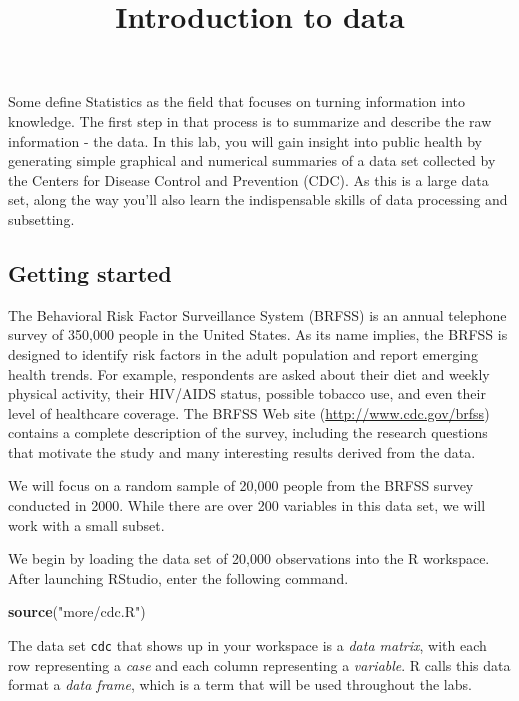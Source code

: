 \documentclass[]{article}
\title{Introduction to data}
\author{}
\date{}
\newenvironment{Shaded}{\begin{snugshade}}{\end{snugshade}}
\newcommand{\KeywordTok}[1]{\textcolor[rgb]{0.13,0.29,0.53}{\textbf{{#1}}}}
\newcommand{\StringTok}[1]{\textcolor[rgb]{0.31,0.60,0.02}{{#1}}}
\newcommand{\NormalTok}[1]{{#1}}
\begin{document}
\maketitle


Some define Statistics as the field that focuses on turning information
into knowledge. The first step in that process is to summarize and
describe the raw information - the data. In this lab, you will gain
insight into public health by generating simple graphical and numerical
summaries of a data set collected by the Centers for Disease Control and
Prevention (CDC). As this is a large data set, along the way you'll also
learn the indispensable skills of data processing and subsetting.

\subsection{Getting started}\label{getting-started}

The Behavioral Risk Factor Surveillance System (BRFSS) is an annual
telephone survey of 350,000 people in the United States. As its name
implies, the BRFSS is designed to identify risk factors in the adult
population and report emerging health trends. For example, respondents
are asked about their diet and weekly physical activity, their HIV/AIDS
status, possible tobacco use, and even their level of healthcare
coverage. The BRFSS Web site
(\href{http://www.cdc.gov/brfss}{\url{http://www.cdc.gov/brfss}})
contains a complete description of the survey, including the research
questions that motivate the study and many interesting results derived
from the data.

We will focus on a random sample of 20,000 people from the BRFSS survey
conducted in 2000. While there are over 200 variables in this data set,
we will work with a small subset.

We begin by loading the data set of 20,000 observations into the R
workspace. After launching RStudio, enter the following command.

\begin{Shaded}
\begin{Highlighting}[]
\KeywordTok{source}\NormalTok{(}\StringTok{"more/cdc.R"}\NormalTok{)}
\end{Highlighting}
\end{Shaded}

The data set \texttt{cdc} that shows up in your workspace is a
\emph{data matrix}, with each row representing a \emph{case} and each
column representing a \emph{variable}. R calls this data format a
\emph{data frame}, which is a term that will be used throughout the
labs.
\end{document}
